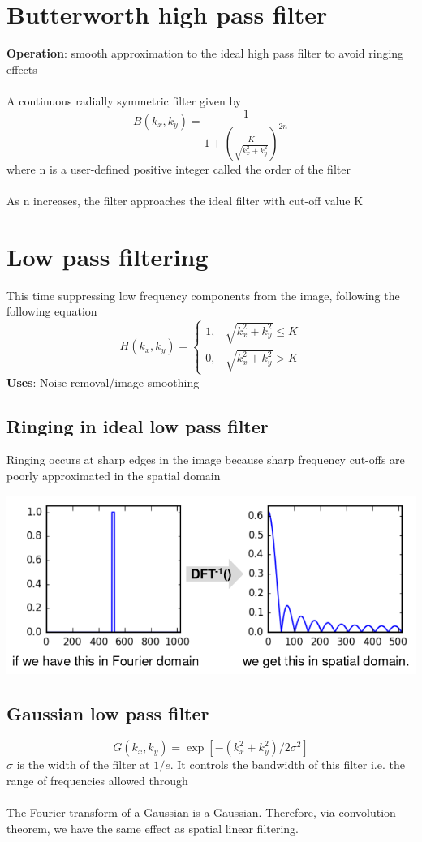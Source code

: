 \documentclass{article}[18pt]
\begin{document}
\section{Butterworth high pass filter}
\textbf{Operation}: smooth approximation to the ideal high pass filter to avoid ringing effects\\
\\
A continuous radially symmetric filter given by
\[
B\left(k_{x}, k_{y}\right)=\frac{1}{1+\left(\frac{K}{\sqrt{k_{x}^{2}+k_{y}^{2}}}\right)^{2 n}}
\]
where n is a user-defined positive integer called the order of the filter\\
\\
As n increases, the filter approaches the ideal filter with cut-off value K
\section{Low pass filtering}
This time suppressing low frequency components from the image, following the following equation
\[
H\left(k_{x}, k_{y}\right)=\left\{\begin{array}{ll}{1,} & {\sqrt{k_{x}^{2}+k_{y}^{2}} \leq K} \\ {0,} & {\sqrt{k_{x}^{2}+k_{y}^{2}}>K}\end{array}\right.
\]
\textbf{Uses}: Noise removal/image smoothing
\subsection{Ringing in ideal low pass filter}
Ringing occurs at sharp edges in the image because sharp frequency cut-offs are poorly approximated in the spatial domain
\begin{center}
	\includegraphics[scale=0.7]{low_pass}
\end{center}
\subsection{Gaussian low pass filter}
\[
G\left(k_{x}, k_{y}\right)=\exp \left[-\left(k_{x}^{2}+k_{y}^{2}\right) / 2 \sigma^{2}\right]
\]
$\sigma$ is the width of the filter at $1/e$. It controls the bandwidth of this filter i.e. the range of frequencies allowed through\\
\\
The Fourier transform of a Gaussian is a Gaussian. Therefore, via convolution theorem, we have the same effect as spatial linear filtering.
\end{document}
